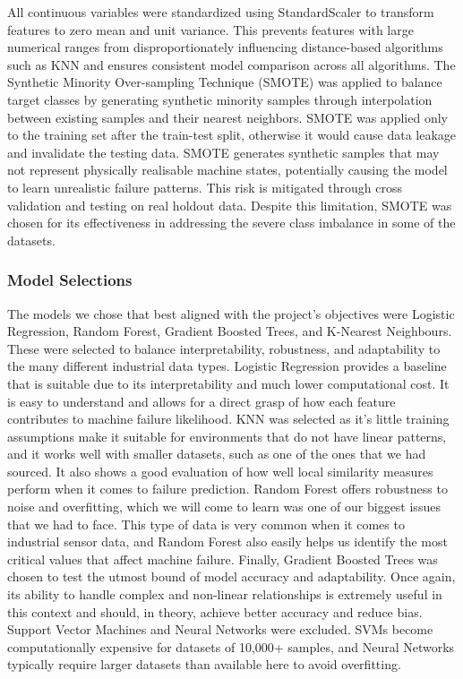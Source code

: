 \documentclass[11pt]{article}
\begin{document}
All continuous variables were standardized using StandardScaler to transform features to zero mean and unit variance. This prevents features with large numerical ranges from disproportionately influencing distance-based algorithms such as KNN and ensures consistent model comparison across all algorithms. The Synthetic Minority Over-sampling Technique (SMOTE) was applied to balance target classes by generating synthetic minority samples through interpolation between existing  samples and their nearest neighbors. SMOTE was applied only to the training set after the train-test split, otherwise it would cause data leakage and invalidate the testing data. SMOTE generates synthetic samples that may not represent 
physically realisable machine states, potentially causing the model to learn 
unrealistic failure patterns. This risk is mitigated through cross validation and testing on real holdout data. Despite this limitation, SMOTE was chosen for its effectiveness in addressing the severe class imbalance in some of the datasets.

\subsubsection{Model Selections}

The models we chose that best aligned with the project's objectives were Logistic Regression, Random Forest, Gradient Boosted Trees, and K-Nearest Neighbours. These were selected to balance interpretability, robustness, and adaptability to the many different industrial data types. Logistic Regression provides a baseline that is suitable due to its interpretability and much lower computational cost. It is easy to understand and allows for a direct grasp of how each feature contributes to machine failure likelihood. KNN was selected as it's little training assumptions make it suitable for environments that do not have linear patterns, and it works well with smaller datasets, such as one of the ones that we had sourced. It also shows a good evaluation of how well local similarity measures perform when it comes to failure prediction. Random Forest offers robustness to noise and overfitting, which we will come to learn was one of our biggest issues that we had to face. This type of data is very common when it comes to industrial sensor data, and Random Forest also easily helps us identify the most critical values that affect machine failure. Finally, Gradient Boosted Trees was chosen to test the utmost bound of model accuracy and adaptability. Once again, its ability to handle complex and non-linear relationships is extremely useful in this context and should, in theory, achieve better accuracy and reduce bias. Support Vector Machines and Neural Networks were excluded. SVMs become computationally expensive for datasets of 10,000+ samples, and Neural Networks typically require larger datasets than available here to avoid overfitting.
\end{document}
